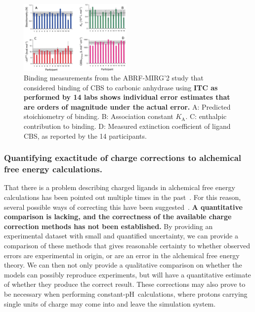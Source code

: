 \documentclass[10pt,final]{article}
\newcommand{\pH}{p$\mathrm{H}$\ }
\begin{document}
\begin{figure}[H]
	\centering
	\includegraphics[width=0.49\textwidth]{figures/cbs_ca_II.PNG}
	\caption{Binding measurements from the ABRF-MIRG'2 study that considered binding of CBS to carbonic anhydrase using \textbf{ITC as performed by 14 labs shows individual error estimates that are orders of magnitude under the actual error.} A: Predicted stoichiometry of binding. B: Association constant $K_\mathrm{A}$. C: enthalpic contribution to binding. D: Measured extinction coefficient of ligand CBS, as reported by the 14 participants.~\autocite{Myszka2003a}}
	\label{figure:abrf-mirg2}
\end{figure}

\subsubsection*{Quantifying exactitude of charge corrections to alchemical free energy calculations.}
That there is a problem describing charged ligands in alchemical free energy calculations has been pointed out multiple times in the past~\autocite{Rocklin2013b,Muddana2014a}. 
%
For this reason, several possible ways of correcting this have been suggested~\autocite{Reif2013a,Rocklin2013a,Lin2014a}.
%
\textbf{A quantitative comparison is lacking, and the correctness of the available charge correction methods has not been established.}
%
By providing an experimental dataset with small and quantified uncertainty, we can provide a comparison of these methods that gives reasonable certainty to whether observed errors are experimental in origin, or are an error in the alchemical free energy theory. 
%
We can then not only provide a qualitative comparison on whether the models can possibly reproduce experiments, but will have a quantitative estimate of whether they produce the correct result.
%
These corrections may also prove to be necessary when performing constant-\pH calculations, where protons carrying single units of charge may come into and leave the simulation system.
\end{document}
